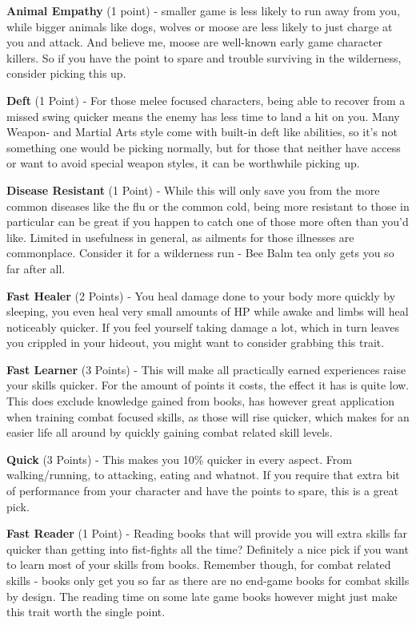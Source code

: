 \documentclass[11pt]{report}
\begin{document}
\textbf{Animal Empathy} (1 point) - smaller game is less likely to run away from you, while bigger animals like dogs, wolves or moose are less likely to just charge at you and attack. And believe me, moose are well-known early game character killers. So if you have the point to spare and trouble surviving in the wilderness, consider picking this up.

\textbf{Deft} (1 Point) - For those melee focused characters, being able to recover from a missed swing quicker means the enemy has less time to land a hit on you. Many Weapon- and Martial Arts style come with built-in deft like abilities, so it's not something one would be picking normally, but for those that neither have access or want to avoid special weapon styles, it can be worthwhile picking up.

\textbf{Disease Resistant} (1 Point) - While this will only save you from the more common diseases like the flu or the common cold, being more resistant to those in particular can be great if you happen to catch one of those more often than you'd like. Limited in usefulness in general, as ailments for those illnesses are commonplace. Consider it for a wilderness run - Bee Balm tea only gets you so far after all.

\textbf{Fast Healer} (2 Points) - You heal damage done to your body more quickly by sleeping, you even heal very small amounts of HP while awake and limbs will heal noticeably quicker. If you feel yourself taking damage a lot, which in turn leaves you crippled in your hideout, you might want to consider grabbing this trait.

\textbf{Fast Learner} (3 Points) - This will make all practically earned experiences raise your skills quicker. For the amount of points it costs, the effect it has is quite low. This does exclude knowledge gained from books, has however great application when training combat focused skills, as those will rise quicker, which makes for an easier life all around by quickly gaining combat related skill levels.

\textbf{Quick} (3 Points) - This makes you 10\% quicker in every aspect. From walking/running, to attacking, eating and whatnot. If you require that extra bit of performance from your character and have the points to spare, this is a great pick.

\textbf{Fast Reader} (1 Point) - Reading books that will provide you will extra skills far quicker than getting into fist-fights all the time? Definitely a nice pick if you want to learn most of your skills from books. Remember though, for combat related skills - books only get you so far as there are no end-game books for combat skills by design. The reading time on some late game books however might just make this trait worth the single point.
\end{document}
